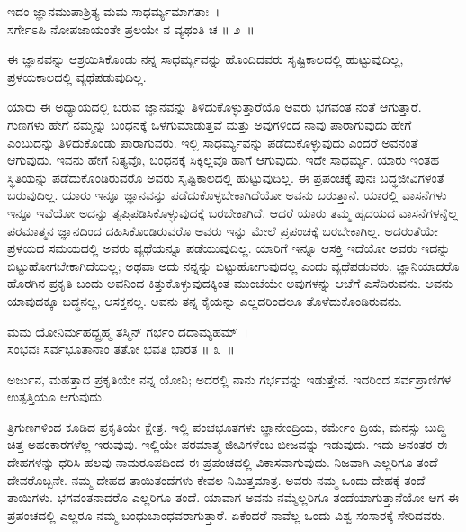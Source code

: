 \begin{shloka}
ಇದಂ ಜ್ಞಾನಮುಪಾಶ್ರಿತ್ಯ ಮಮ ಸಾಧರ್ಮ್ಯಮಾಗತಾಃ~।\\ಸರ್ಗೇಽಪಿ ನೋಪಜಾಯಂತೇ ಪ್ರಲಯೇ ನ ವ್ಯಥಂತಿ ಚ \hfill॥ ೨~॥
\end{shloka}

\begin{artha}
ಈ ಜ್ಞಾನವನ್ನು ಆಶ್ರಯಿಸಿಕೊಂಡು ನನ್ನ ಸಾಧರ್ಮ್ಯವನ್ನು ಹೊಂದಿದವರು ಸೃಷ್ಟಿಕಾಲದಲ್ಲಿ ಹುಟ್ಟುವುದಿಲ್ಲ, ಪ್ರಳಯಕಾಲದಲ್ಲಿ ವ್ಯಥೆಪಡುವುದಿಲ್ಲ.
\end{artha}

ಯಾರು ಈ ಅಧ್ಯಾಯದಲ್ಲಿ ಬರುವ ಜ್ಞಾನವನ್ನು ತಿಳಿದುಕೊಳ್ಳುತ್ತಾರೆಯೊ ಅವರು ಭಗವಂತ ನಂತೆ ಆಗುತ್ತಾರೆ. ಗುಣಗಳು ಹೇಗೆ ನಮ್ಮನ್ನು ಬಂಧನಕ್ಕೆ ಒಳಗುಮಾಡುತ್ತವೆ ಮತ್ತು ಅವುಗಳಿಂದ ನಾವು ಪಾರಾಗುವುದು ಹೇಗೆ ಎಂಬುದನ್ನು ತಿಳಿದುಕೊಂಡು ಪಾರಾಗುವರು. ಇಲ್ಲಿ ಸಾಧರ್ಮ್ಯವನ್ನು ಪಡೆದುಕೊಳ್ಳುವುದು ಎಂದರೆ ಅವನಂತೆ ಆಗುವುದು. ಇವನು ಹೇಗೆ ನಿತ್ಯವೊ, ಬಂಧನಕ್ಕೆ ಸಿಕ್ಕಿಲ್ಲವೊ ಹಾಗೆ ಆಗುವುದು. ಇದೇ ಸಾಧರ್ಮ್ಯ. ಯಾರು ಇಂತಹ ಸ್ಥಿತಿಯನ್ನು ಪಡೆದುಕೊಂಡಿರುವರೊ ಅವರು ಸೃಷ್ಟಿಕಾಲದಲ್ಲಿ ಹುಟ್ಟುವುದಿಲ್ಲ. ಈ ಪ್ರಪಂಚಕ್ಕೆ ಪುನಃ ಬದ್ಧ\-ಜೀವಿಗಳಂತೆ ಬರುವುದಿಲ್ಲ. ಯಾರು ಇನ್ನೂ ಜ್ಞಾನವನ್ನು ಪಡೆದುಕೊಳ್ಳಬೇಕಾಗಿದೆಯೋ ಅವನು ಬರುತ್ತಾನೆ. ಯಾರಲ್ಲಿ ವಾಸನೆಗಳು ಇನ್ನೂ ಇವೆಯೋ ಅದನ್ನು ತೃಪ್ತಿಪಡಿಸಿಕೊಳ್ಳುವುದಕ್ಕೆ ಬರಬೇಕಾ\-ಗಿದೆ. ಆದರೆ ಯಾರು ತಮ್ಮ ಹೃದಯದ ವಾಸನೆಗಳನ್ನೆಲ್ಲ ಪರಮಾತ್ಮನ ಜ್ಞಾನದಿಂದ ದಹಿಸಿ\-ಕೊಂಡಿರುವರೊ ಅವರು ಇನ್ನು ಮೇಲೆ ಪ್ರಪಂಚಕ್ಕೆ ಬರಬೇಕಾಗಿಲ್ಲ. ಅದರಂತೆಯೇ ಪ್ರಳಯದ ಸಮಯದಲ್ಲಿ ಅವರು ವ್ಯಥೆಯನ್ನೂ ಪಡೆಯುವುದಿಲ್ಲ. ಯಾರಿಗೆ ಇನ್ನೂ ಆಸಕ್ತಿ ಇದೆಯೋ ಅವರು ಇದನ್ನು ಬಿಟ್ಟುಹೋಗಬೇಕಾಗಿದೆಯಲ್ಲ; ಅಥವಾ ಅದು ನನ್ನನ್ನು ಬಿಟ್ಟುಹೋಗುವುದಲ್ಲ ಎಂದು ವ್ಯಥೆಪಡುವರು. ಜ್ಞಾನಿಯಾದರೊ ಹೊರಗಿನ ಪ್ರಕೃತಿ ಬಂದು ಅವನಿಂದ ಕಿತ್ತುಕೊಳ್ಳುವುದ\-ಕ್ಕಿಂತ ಮುಂಚೆಯೇ ಅವುಗಳನ್ನು ಆಚೆಗೆ ಎಸೆದಿರುವನು. ಅವನು ಯಾವುದಕ್ಕೂ ಬದ್ಧನಲ್ಲ, ಆಸಕ್ತನಲ್ಲ. ಅವನು ತನ್ನ ಕೈಯನ್ನು ಎಲ್ಲದರಿಂದಲೂ ತೊಳೆದುಕೊಂಡಿರುವನು.

\begin{shloka}
ಮಮ ಯೋನಿರ್ಮಹದ್ಬ್ರಹ್ಮ ತಸ್ಮಿನ್ ಗರ್ಭಂ ದದಾಮ್ಯಹಮ್~।\\ಸಂಭವಃ ಸರ್ವಭೂತಾನಾಂ ತತೋ ಭವತಿ ಭಾರತ \hfill॥ ೩~॥
\end{shloka}

\begin{artha}
ಅರ್ಜುನ, ಮಹತ್ತಾದ ಪ್ರಕೃತಿಯೇ ನನ್ನ ಯೋನಿ; ಅದರಲ್ಲಿ ನಾನು ಗರ್ಭವನ್ನು ಇಡುತ್ತೇನೆ. ಇದರಿಂದ ಸರ್ವಪ್ರಾಣಿಗಳ ಉತ್ಪತ್ತಿಯೂ ಆಗುವುದು.
\end{artha}

ತ್ರಿಗುಣಗಳಿಂದ ಕೂಡಿದ ಪ್ರಕೃತಿಯೇ ಕ್ಷೇತ್ರ. ಇಲ್ಲಿ ಪಂಚಭೂತಗಳು ಜ್ಞಾನೇಂದ್ರಿಯ, ಕರ್ಮೇಂ ದ್ರಿಯ, ಮನಸ್ಸು ಬುದ್ಧಿ ಚಿತ್ತ ಅಹಂಕಾರಗಳೆಲ್ಲ ಇರುವುವು. ಇಲ್ಲಿಯೇ ಪರಮಾತ್ಮ ಜೀವಿಗಳೆಂಬ ಬೀಜವನ್ನು ಇಡುವುದು. ಇದು ಅನಂತರ ಈ ದೇಹಗಳನ್ನು ಧರಿಸಿ ಹಲವು ನಾಮರೂಪದಿಂದ ಈ ಪ್ರಪಂಚದಲ್ಲಿ ವಿಕಾಸವಾಗುವುದು. ನಿಜವಾಗಿ ಎಲ್ಲರಿಗೂ ತಂದೆ ದೇವ\-ರೊಬ್ಬನೇ. ನಮ್ಮ ದೇಹದ ತಾಯಿತಂದೆಗಳು ಕೇವಲ ನಿಮಿತ್ತಮಾತ್ರ. ಅವರು ನಮ್ಮ ಒಂದು ದೇಹಕ್ಕೆ ತಂದೆ ತಾಯಿಗಳು. ಭಗವಂತನಾದರೊ ಎಲ್ಲರಿಗೂ ತಂದೆ. ಯಾವಾಗ ಅವನು ನಮ್ಮೆಲ್ಲರಿಗೂ ತಂದೆಯಾಗುತ್ತಾನೆಯೋ ಆಗ ಈ ಪ್ರಪಂಚದಲ್ಲಿ ಎಲ್ಲರೂ ನಮ್ಮ ಬಂಧುಬಾಂಧವ\-ರಾಗುತ್ತಾರೆ. ಏಕೆಂದರೆ ನಾವೆಲ್ಲ ಒಂದು ವಿಶ್ವ ಸಂಸಾರಕ್ಕೆ ಸೇರಿದವರು.

